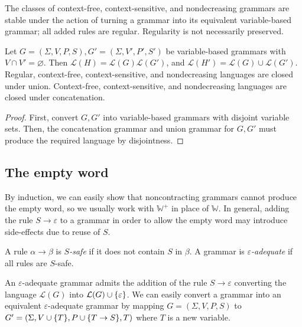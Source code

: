 \begin{remark}
	The classes of context-free, context-sensitive, and nondecreasing grammars are stable under the action of turning a grammar into its equivalent variable-based grammar; all added rules are regular.
	Regularity is not necessarily preserved.
\end{remark}
\begin{theorem}
	Let \( G = (\Sigma, V, P, S), G' = (\Sigma, V', P', S') \) be variable-based grammars with \( V \cap V' = \varnothing \).
	Then \( \mathcal L(H) = \mathcal L(G)\mathcal L(G') \), and \( \mathcal L(H') = \mathcal L(G) \cup \mathcal L(G') \).
	Regular, context-free, context-sensitive, and nondecreasing languages are closed under union.
	Context-free, context-sensitive, and nondecreasing languages are closed under concatenation.
\end{theorem}
\begin{proof}
	First, convert \( G, G' \) into variable-based grammars with disjoint variable sets.
	Then, the concatenation grammar and union grammar for \( G, G' \) must produce the required language by disjointness.
\end{proof}

\subsection{The empty word}
\begin{remark}
	By induction, we can easily show that noncontracting grammars cannot produce the empty word, so we usually work with \( \mathbb W^+ \) in place of \( \mathbb W \).
	In general, adding the rule \( S \to \varepsilon \) to a grammar in order to allow the empty word may introduce side-effects due to reuse of \( S \).
\end{remark}
\begin{definition}
	A rule \( \alpha \to \beta \) is \emph{\( S \)-safe} if it does not contain \( S \) in \( \beta \).
	A grammar is \emph{\( \varepsilon \)-adequate} if all rules are \( S \)-safe.
\end{definition}
An \( \varepsilon \)-adequate grammar admits the addition of the rule \( S \to \varepsilon \) converting the language \( \mathcal L(G) \) into \( \mathcal L(G) \cup \qty{\varepsilon} \).
We can easily convert a grammar into an equivalent \( \varepsilon \)-adequate grammar by mapping \( G = (\Sigma, V, P, S) \) to \( G' = (\Sigma, V \cup \qty{T}, P \cup \qty{T \to S}, T) \) where \( T \) is a new variable.
